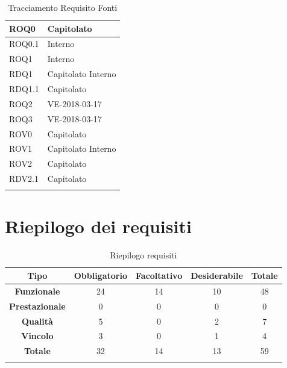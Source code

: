 \documentclass[../AnalisideiRequisiti.tex]{subfiles}
\begin{document}
\begin{longtable}{| p{4cm} | p{4cm} |}
\newline 
ROQ0&\newline Capitolato
\\[1em]
\hline
\newline 
ROQ0.1&\newline Interno
\\[1em]
\hline
\newline 
ROQ1&\newline Interno
\\[1em]
\hline
\newline
RDQ1&\newline Capitolato \newline Interno
\\[1em]
\hline	
\newline
RDQ1.1&\newline Capitolato
\\[1em]
\hline	
\newline
ROQ2&\newline VE-2018-03-17
\\[1em]
\hline	
\newline
ROQ3&\newline VE-2018-03-17
\\[1em]
\hline
\newline 
ROV0&\newline Capitolato
\\[1em]
\hline	
\newline 
ROV1&\newline Capitolato \newline Interno
\\[1em]
\hline
\newline 
ROV2&\newline Capitolato
\\[1em]
\hline
\newline
RDV2.1&\newline Capitolato
\\[1em]
\hline
\caption{Tracciamento Requisito Fonti}
\end{longtable}

\newpage

\section{Riepilogo dei requisiti}
	\begin{longtable}{| c | c | c | c | c |}
	\hline
	\textbf{Tipo} & \textbf{Obbligatorio}& \textbf{Facoltativo} &\textbf{Desiderabile} &\textbf{Totale} \\
	\hline
	\endhead
\textbf{Funzionale} &24& 14 & 10 & 48\\

\hline\textbf{Prestazionale} &0& 0& 0 &0  \\

\hline\textbf{Qualità} &5& 0&2&7 \\

\hline\textbf{Vincolo}&3& 0& 1 & 4 \\

\hline\textbf{Totale}&32& 14& 13 & 59 \\

\hline
\caption{Riepilogo requisiti}
\end{longtable}
\end{document}
